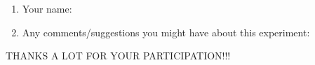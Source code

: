 \documentclass{article}
\title{}
\author{Debugging experiment - Exit survey for population NoTool}
\date{July 30, 2003}
\begin{document}
\maketitle
\begin{flushleft}
\vspace{0.5in}

\thispagestyle{empty}


\begin{enumerate}
\item{Your name:}
\item{Any comments/suggestions you might have about this experiment:}
\end{enumerate}


\vspace{3in}
\begin{center}
THANKS A LOT FOR YOUR PARTICIPATION!!!
\end{center}

\end{flushleft}
\end{document}
